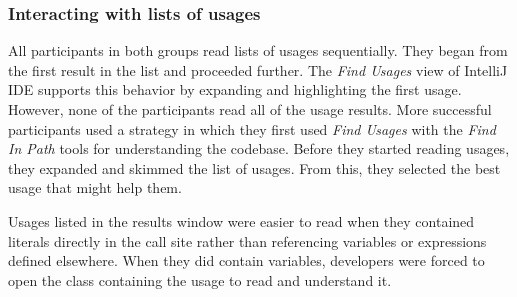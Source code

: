 \documentclass[conference]{IEEEtran}
\begin{document}


\subsubsection{Interacting with lists of usages} All participants in both groups read lists of usages sequentially. They began from the first result in the list and proceeded further.
The \textit{Find Usages} view of IntelliJ IDE supports this behavior by expanding and highlighting the first usage. 
However, none of the participants read all of the usage results. 
More successful participants used a strategy in which they first used \textit{Find Usages} with the \textit{Find In Path} tools for understanding the codebase. Before they started reading usages, they expanded and skimmed the list of usages. From this, they selected the best usage that might help them. \par


Usages listed in the results window were easier to read when they contained literals directly in the call site rather than referencing variables or expressions defined elsewhere. When they did contain variables, developers were forced to open the class containing the usage to read and understand it. \par
\end{document}
